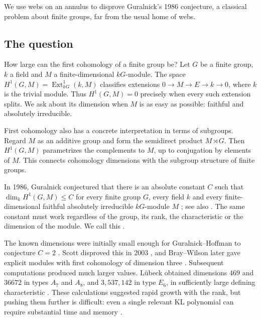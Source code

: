 \documentclass[a4paper,11pt]{amsart}
\let\emph\relax
\numberwithin{equation}{subsection}
\theoremstyle{plain}
\theoremstyle{definition}
\theoremstyle{remark}
\begin{document}
We use webs on an annulus to disprove Guralnick's 1986 conjecture,
a classical problem about finite groups, far from the usual home of webs.

\subsection{The question}

How large can the first cohomology of a finite group be?
Let $G$ be a finite group, $k$ a field and $M$ a
finite-dimensional $kG$-module. The space
$H^1(G,M)=\operatorname{Ext}^1_{kG}(k,M)$ classifies extensions
$0\to M\to E\to k\to0$, where $k$ is the trivial module.
Thus $H^1(G,M)=0$ precisely when every such extension splits.
We ask about its dimension when $M$ is as easy as possible: faithful and absolutely irreducible.

\begin{remark}
First cohomology also has a concrete interpretation in terms of
subgroups. Regard $M$ as an additive group and form the semidirect
product $M\rtimes G$. Then $H^1(G,M)$ parametrizes the complements
to $M$, up to conjugation by elements of $M$.
This connects cohomology dimensions with the subgroup structure
of finite groups.
\end{remark}

In 1986, Guralnick conjectured that there is an absolute constant
$C$ such that $\dim_k H^1(G,M)\le C$ for every finite group $G$,
every field $k$ and every finite-dimensional faithful absolutely
irreducible $kG$-module $M$
\cite[Conjecture~2]{Guralnick}; see also
\cite[Conjecture~4.4]{Luebeck}.
The same constant must work regardless of the group, its rank,
the characteristic or the dimension of the module. We call this \emph{Guralnick's conjecture}.

The known dimensions were initially small enough for
Guralnick--Hoffman to conjecture $C=2$
\cite[Conjecture~2]{GuralnickHoffman}.
Scott disproved this in 2003 \cite{Scott}, and Bray--Wilson
later gave explicit modules with first cohomology of
dimension three \cite{BrayWilson}.
Subsequent computations produced much larger values.
L\"ubeck obtained dimensions $469$ and $36672$ in types $A_7$
and $A_8$, and $3{,}537{,}142$ in type $E_6$, in sufficiently
large defining characteristic
\cite[Theorem~4.7]{Luebeck}.
These calculations suggested rapid growth with the rank,
but pushing them further is difficult: even a single
relevant KL polynomial can require substantial time
and memory \cite{Luebeck,ScottSprowl}.
\end{document}
